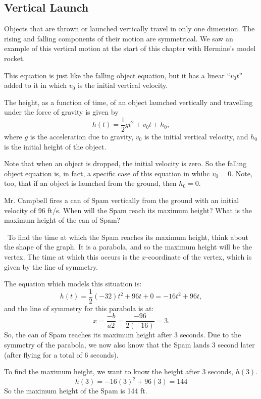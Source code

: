 \subsection{Vertical Launch}

Objects that are thrown or launched vertically travel in only one dimension. The rising and falling components of their motion are symmetrical. We saw an example of this vertical motion at the start of this chapter with Hermine's model rocket.

This equation is just like the falling object equation, but it has a linear ``$v_0t$'' added to it in which $v_0$ is the initial vertical velocity.

\begin{boxeddef}
The height, as a function of time, of an object launched vertically and travelling under the force of gravity is given by
\[h(t) = \frac{1}{2}gt^2 + v_0t + h_0,\]
where $g$ is the acceleration due to gravity, $v_0$ is the initial vertical velocity, and $h_0$ is the initial height of the object.
\end{boxeddef}

Note that when an object is dropped, the initial velocity is zero. So the falling object equation is, in fact, a specific case of this equation in whihc $v_0=0$. Note, too, that if an object is launched from the ground, then $h_0=0$.

\begin{boxedex}
Mr. Campbell fires a can of Spam vertically from the ground with an initial velocity of 96 ft/s. When will the Spam reach its maximum height? What is the maximum height of the can of Spam?

\exsoln\ To find the time at which the Spam reaches its maximum height, think about the shape of the graph. It is a parabola, and so the maximum height will be the vertex. The time at which this occurs is the $x$-coordinate of the vertex, which is given by the line of symmetry.

The equation which models this situation is:
\[h(t) = \frac{1}{2}(-32)t^2 + 96t + 0 = -16t^2+96t,\]
and the line of symmetry for this parabola is at:
\[x=\frac{-b}{a2} = \frac{-96}{2(-16)} = 3.\]
So, the can of Spam reaches its maximum height after 3 seconds. Due to the symmetry of the parabola, we now also know that the Spam lands 3 second later (after flying for a total of 6 seconds).

To find the maximum height, we want to know the height after 3 seconds, $h(3)$.
\[h(3) = -16(3)^2 + 96(3) = 144\]
So the maximum height of the Spam is 144 ft.
\end{boxedex}

